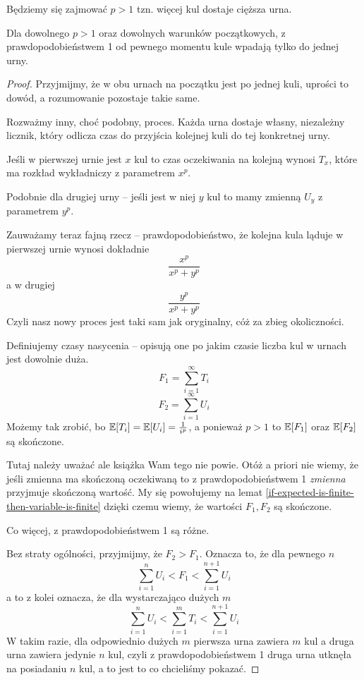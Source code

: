 Będziemy się zajmować \( p > 1 \) tzn. więcej kul dostaje cięższa urna.

\begin{theorem}
	Dla dowolnego \( p > 1 \) oraz dowolnych warunków początkowych, z prawdopodobieństwem 1 od pewnego momentu kule wpadają tylko do jednej urny.
\end{theorem}
\begin{proof}
	Przyjmijmy, że w obu urnach na początku jest po jednej kuli, uprości to dowód, a rozumowanie pozostaje takie same.

	Rozważmy inny, choć podobny, proces.
	Każda urna dostaje własny, niezależny licznik, który odlicza czas do przyjścia kolejnej kuli do tej konkretnej urny.

	Jeśli w pierwszej urnie jest \( x \) kul to czas oczekiwania na kolejną wynosi \( T_x \), które ma rozkład wykładniczy z parametrem \( x^p \).

	Podobnie dla drugiej urny -- jeśli jest w niej \( y \) kul to mamy zmienną \( U_y \) z parametrem \( y^p \).

	Zauważamy teraz fajną rzecz -- prawdopodobieństwo, że kolejna kula ląduje w pierwszej urnie wynosi dokładnie
	\[
		\frac{x^p}{x^p + y^p}
	\]
	a w drugiej
	\[
		\frac{y^p}{x^p + y^p}
	\]
	Czyli nasz nowy proces jest taki sam jak oryginalny, cóż za zbieg okoliczności.

	Definiujemy czasy nasycenia -- opisują one po jakim czasie liczba kul w urnach jest dowolnie duża.
	\[
		F_1 = \sum_{i=1}^\infty T_i
	\]
	\[
		F_2 = \sum_{i=1}^\infty U_i
	\]
	Możemy tak zrobić, bo \(\expected{T_i} = \expected{U_i} = \frac{1}{i^p}\), a ponieważ \( p > 1 \) to \( \expected{F_1}\) oraz \(\expected{F_2} \) są skończone.

	Tutaj należy uważać ale książka Wam tego nie powie.
	Otóż a priori nie wiemy, że jeśli zmienna ma skończoną oczekiwaną to z prawdopodobieństwem 1 \textit{zmienna} przyjmuje skończoną wartość.
	My się powołujemy na lemat \ref{if-expected-is-finite-then-variable-is-finite}
	dzięki czemu wiemy, że wartości \( F_1, F_2 \) są skończone.


	Co więcej, z prawdopodobieństwem 1 są różne.

	Bez straty ogólności, przyjmijmy, że \( F_2 > F_1 \). Oznacza to, że dla pewnego \( n \)
	\[
		\sum_{i=1}^n U_i < F_1 < \sum_{i=1}^{n+1} U_i
	\]
	a to z kolei oznacza, że dla wystarczająco dużych \( m \)
	\[
		\sum_{i=1}^n U_i < \sum_{i=1}^m T_i < \sum_{i=1}^{n+1} U_i
	\]
	W takim razie, dla odpowiednio dużych \( m \) pierwsza urna zawiera \( m \) kul a druga urna zawiera jedynie \( n \) kul, czyli z prawdopodobieństwem 1 druga urna utknęła na posiadaniu \( n \) kul, a to jest to co chcieliśmy pokazać.
\end{proof}

